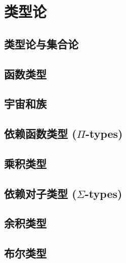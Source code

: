 \chapter{类型论}
\label{cha:typetheory}

\section{类型论与集合论}
\label{sec:types-vs-sets}


\section{函数类型}
\label{sec:function-types}


\section{宇宙和族}
\label{sec:universes}


\section{依赖函数类型 (\texorpdfstring{$\Pi$}{Π}-types)}
\label{sec:pi-types}


\section{乘积类型}
\label{sec:finite-product-types}


\section{依赖对子类型 (\texorpdfstring{$\Sigma$}{Σ}-types)}
\label{sec:sigma-types}


\section{余积类型}
\label{sec:coproduct-types}


\section{布尔类型}
\label{sec:type-booleans}


